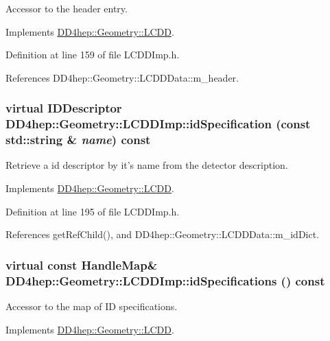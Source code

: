 Accessor to the header entry. 

Implements \hyperlink{class_d_d4hep_1_1_geometry_1_1_l_c_d_d_ad09f49fc86a5b286ae55901e2b169d7c}{DD4hep::Geometry::LCDD}.

Definition at line 159 of file LCDDImp.h.

References DD4hep::Geometry::LCDDData::m\_\-header.\hypertarget{class_d_d4hep_1_1_geometry_1_1_l_c_d_d_imp_ade361431838946ea24068e4e74632da4}{
\subsubsection[{idSpecification}]{\setlength{\rightskip}{0pt plus 5cm}virtual {\bf IDDescriptor} DD4hep::Geometry::LCDDImp::idSpecification (const std::string \& {\em name}) const}}
\label{class_d_d4hep_1_1_geometry_1_1_l_c_d_d_imp_ade361431838946ea24068e4e74632da4}


Retrieve a id descriptor by it's name from the detector description. 

Implements \hyperlink{class_d_d4hep_1_1_geometry_1_1_l_c_d_d_ac08b5db047061a7b08d8b78bd7cb5e72}{DD4hep::Geometry::LCDD}.

Definition at line 195 of file LCDDImp.h.

References getRefChild(), and DD4hep::Geometry::LCDDData::m\_\-idDict.\hypertarget{class_d_d4hep_1_1_geometry_1_1_l_c_d_d_imp_a85a31743f9716ca28a09afb1409ee3be}{
\subsubsection[{idSpecifications}]{\setlength{\rightskip}{0pt plus 5cm}virtual const {\bf HandleMap}\& DD4hep::Geometry::LCDDImp::idSpecifications () const}}
\label{class_d_d4hep_1_1_geometry_1_1_l_c_d_d_imp_a85a31743f9716ca28a09afb1409ee3be}


Accessor to the map of ID specifications. 

Implements \hyperlink{class_d_d4hep_1_1_geometry_1_1_l_c_d_d_a16ddadf18c24ad54b816354107338a80}{DD4hep::Geometry::LCDD}.

